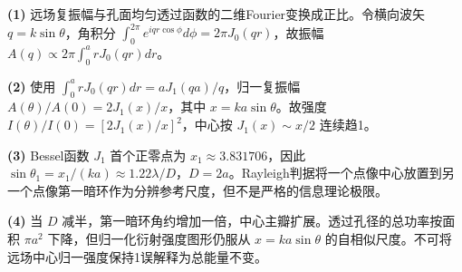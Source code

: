 \par\noindent\textbf{(1)} 远场复振幅与孔面均匀透过函数的二维Fourier变换成正比。令横向波矢 \(q=k\sin\theta\)，角积分 \(\int_0^{2\pi}e^{iqr\cos\phi}d\phi=2\pi J_0(qr)\)，故振幅 \(A(q)\propto2\pi\int_0^arJ_0(qr)dr\)。
\par\noindent\textbf{(2)} 使用 \(\int_0^arJ_0(qr)dr=aJ_1(qa)/q\)，归一复振幅 \(A(\theta)/A(0)=2J_1(x)/x\)，其中 \(x=ka\sin\theta\)。故强度 \(I(\theta)/I(0)=[2J_1(x)/x]^2\)，中心按 \(J_1(x)\sim x/2\) 连续趋1。
\par\noindent\textbf{(3)} Bessel函数 \(J_1\) 首个正零点为 \(x_1\approx3.831706\)，因此 \(\sin\theta_1=x_1/(ka)\approx1.22\lambda/D\)，\(D=2a\)。Rayleigh判据将一个点像中心放置到另一个点像第一暗环作为分辨参考尺度，但不是严格的信息理论极限。
\par\noindent\textbf{(4)} 当 \(D\) 减半，第一暗环角约增加一倍，中心主瓣扩展。透过孔径的总功率按面积 \(\pi a^2\) 下降，但归一化衍射强度图形仍服从 \(x=ka\sin\theta\) 的自相似尺度。不可将远场中心归一强度保持1误解释为总能量不变。

